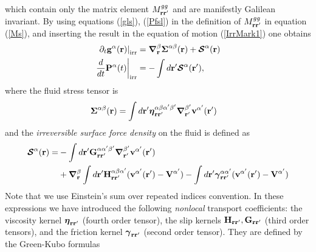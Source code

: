 \documentclass[b5paper,openright,10pt]{book}
\begin{document}
which contain only  the matrix element $M^{gg}_{{\bf  r}{\bf r}'}$ and are
manifestly  Galilean   invariant.   By  using  equations   (\ref{gls}),
(\ref{Pfsl}) {in} the  definition  of $M^{gg}_{{\bf  r}{\bf r}'}$  in
equation (\ref{Ms}),  and inserting  the result in  the equation  of motion
(\ref{IrrMark1}) one obtains
\begin{align}
\left.  \partial_t{\bf g}^\alpha({\bf r})\right|_{\rm irr}&= \boldsymbol{\nabla}_{\bf r}^{\beta}\boldsymbol{\Sigma}^{\alpha\beta}({\bf r}) +\boldsymbol{{\cal S}}^\alpha({\bf r}) 
\nonumber\\
\left.\frac{d}{dt}{\bf P}^\alpha(t)\right|_{\rm irr}&=-\int d{\bf r}'   \boldsymbol{{\cal S}}^\alpha({\bf r}'),
\label{Irr}
\end{align}
where the fluid stress tensor is
\begin{align}
  \boldsymbol{\Sigma}^{\alpha\beta}({\bf r})&=
\int d{\bf r}'
\boldsymbol{\eta}^{\alpha\beta\alpha'\beta'}_{{\bf r}{\bf r}'}
\boldsymbol{\nabla}_{{\bf r}'}^{\beta'}{\bf v}^{\alpha'}({\bf r}')
\label{FluidStress}
\end{align}
and the \textit{irreversible surface force density} on the fluid is defined as
\begin{align}
  \boldsymbol{{\cal S}}^\alpha({\bf r})=&
-\int d{\bf r}'{\bf G}^{\alpha\alpha'\beta'}_{{\bf r}{\bf r}'}
\boldsymbol{\nabla}_{{\bf r}'}^{\beta'} {\bf v}^{\alpha'}({\bf r}')
\nonumber\\
&+\boldsymbol{\nabla}_{{\bf r}}^{\beta}\int d{\bf r}'{\bf H}^{\alpha\beta\alpha'}_{{\bf r}{\bf r}'}
( {\bf v}^{\alpha'}({\bf r}')-{\bf V}^{\alpha'})
-\int d{\bf r}'
\boldsymbol{\gamma}^{\alpha\alpha'}_{{\bf r}{\bf r}'}( {\bf v}^{\alpha'}({\bf r}')
-{\bf V}^{\alpha'})
\label{Irreversibleforces}
\end{align}
Note that we use Einstein's sum over repeated indices convention.
In   these    expressions   we    have   introduced    the   following
\textit{nonlocal}  transport   coefficients:  the   viscosity  kernel
$\boldsymbol{\eta}_{{\bf r}{\bf r}'}$ (fourth  order tensor), the slip
kernels ${\bf  H}_{{\bf r}{\bf r}'},{\bf G}_{{\bf  r}{\bf r}'}$ (third
order  tensors), and  the  friction kernel  $\boldsymbol{\gamma}_{{\bf
    r}{\bf  r}'}$ (second  order  tensor).  They  are  defined by  the
Green-Kubo formulas
\end{document}
